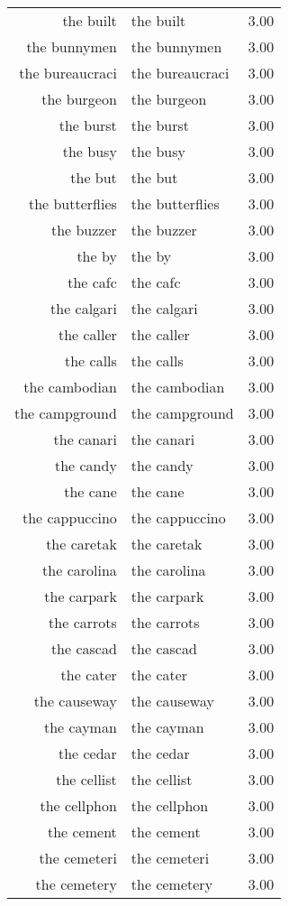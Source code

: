 \begin{table}[ht]
\begin{tabular}{rlr}
  the built & the built & 3.00 \\ 
  the bunnymen & the bunnymen & 3.00 \\ 
  the bureaucraci & the bureaucraci & 3.00 \\ 
  the burgeon & the burgeon & 3.00 \\ 
  the burst & the burst & 3.00 \\ 
  the busy & the busy & 3.00 \\ 
  the but & the but & 3.00 \\ 
  the butterflies & the butterflies & 3.00 \\ 
  the buzzer & the buzzer & 3.00 \\ 
  the by & the by & 3.00 \\ 
  the cafc & the cafc & 3.00 \\ 
  the calgari & the calgari & 3.00 \\ 
  the caller & the caller & 3.00 \\ 
  the calls & the calls & 3.00 \\ 
  the cambodian & the cambodian & 3.00 \\ 
  the campground & the campground & 3.00 \\ 
  the canari & the canari & 3.00 \\ 
  the candy & the candy & 3.00 \\ 
  the cane & the cane & 3.00 \\ 
  the cappuccino & the cappuccino & 3.00 \\ 
  the caretak & the caretak & 3.00 \\ 
  the carolina & the carolina & 3.00 \\ 
  the carpark & the carpark & 3.00 \\ 
  the carrots & the carrots & 3.00 \\ 
  the cascad & the cascad & 3.00 \\ 
  the cater & the cater & 3.00 \\ 
  the causeway & the causeway & 3.00 \\ 
  the cayman & the cayman & 3.00 \\ 
  the cedar & the cedar & 3.00 \\ 
  the cellist & the cellist & 3.00 \\ 
  the cellphon & the cellphon & 3.00 \\ 
  the cement & the cement & 3.00 \\ 
  the cemeteri & the cemeteri & 3.00 \\ 
  the cemetery & the cemetery & 3.00 \\ 

\end{tabular}
\end{table}
